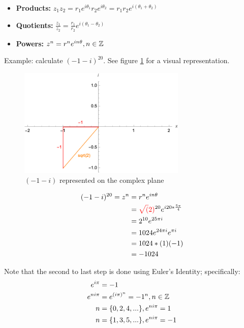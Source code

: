 \documentclass[12pt]{article}
\begin{document}
\begin{itemize}
    \item \textbf{Products:} $z_1z_2 = r_1 e^{i\theta_1} r_2 e^{i\theta_2} = r_1 r_2 e^{i(\theta_1+\theta_2)}$
    \item \textbf{Quotients:} $\frac{z_1}{z_2} = \frac{r_1}{r_2} e^{i(\theta_1-\theta_2)}$
    \item \textbf{Powers:} $z^n = r^n e^{i n \theta}, n \in \mathbb{Z}$
\end{itemize}

Example: calculate $(-1-i)^{20}$. See figure \ref{fig:demoivreseg} for a visual representation.

\begin{figure}[!ht]
    \centering
    \includegraphics[width=8cm]{misc/demoivresexample.png}
    \caption{$(-1-i)$ represented on the complex plane}
    \label{fig:demoivreseg}
\end{figure}

\begin{equation}
    \begin{split}
        (-1-i)^{20} = z^n &= r^n e^{i n \theta}\\
        &= \textcolor{red}{\sqrt(2)}^{20} e^{i 20 * \frac{5\pi}{4}}\\
        &= 2^{10} e^{25 \pi i }\\
        &= 1024 e^{24 \pi i} e^{\pi i}\\
        &= 1024 * (1) (-1) \\
        &= -1024
    \end{split}
\end{equation}

Note that the second to last step is done using Euler's Identity; specifically:
\begin{equation}
    \begin{split}
        e^{i \pi} &= -1\\
        e^{n i\pi} &= e^{{(i\pi)}^{n}}= -1^{n}, n \in \mathbb{Z}\\
        n &= \{0, 2, 4, ...\}, e^{n i \pi} = 1\\
        n &= \{1, 3, 5, ...\}, e^{n i \pi} = -1\\
    \end{split}
\end{equation}
\end{document}
